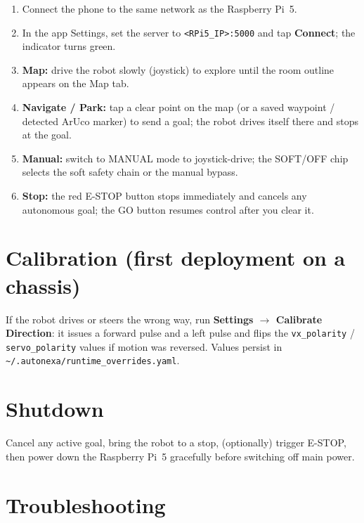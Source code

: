 \documentclass[12pt,a4paper]{report}
\begin{document}
\begin{appendices}
\begin{enumerate}[leftmargin=1.4cm]
    \item Connect the phone to the same network as the Raspberry Pi~5.
    \item In the app Settings, set the server to \texttt{<RPi5\_IP>:5000} and tap
          \textbf{Connect}; the indicator turns green.
    \item \textbf{Map:} drive the robot slowly (joystick) to explore until the
          room outline appears on the Map tab.
    \item \textbf{Navigate / Park:} tap a clear point on the map (or a saved
          waypoint / detected ArUco marker) to send a goal; the robot drives
          itself there and stops at the goal.
    \item \textbf{Manual:} switch to MANUAL mode to joystick-drive; the SOFT/OFF
          chip selects the soft safety chain or the manual bypass.
    \item \textbf{Stop:} the red E-STOP button stops immediately and cancels any
          autonomous goal; the GO button resumes control after you clear it.
\end{enumerate}

\section{Calibration (first deployment on a chassis)}

If the robot drives or steers the wrong way, run \textbf{Settings $\rightarrow$
Calibrate Direction}: it issues a forward pulse and a left pulse and flips the
\texttt{vx\_polarity} / \texttt{servo\_polarity} values if motion was reversed.
Values persist in \texttt{\textasciitilde/.autonexa/runtime\_overrides.yaml}.

\section{Shutdown}

Cancel any active goal, bring the robot to a stop, (optionally) trigger E-STOP,
then power down the Raspberry Pi~5 gracefully before switching off main power.

\section{Troubleshooting}


\end{appendices}
\end{document}
